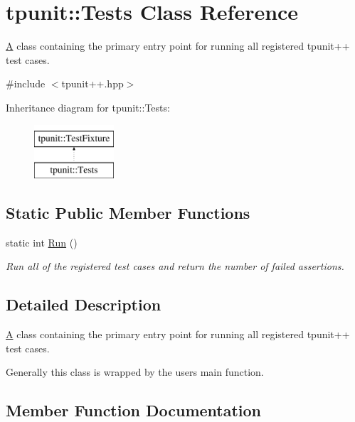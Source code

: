 \hypertarget{classtpunit_1_1Tests}{}\section{tpunit\+::Tests Class Reference}
\label{classtpunit_1_1Tests}


\mbox{\hyperlink{structA}{A}} class containing the primary entry point for running all registered tpunit++ test cases.  




{\ttfamily \#include $<$tpunit++.\+hpp$>$}

Inheritance diagram for tpunit\+::Tests\+:\begin{figure}[H]
\begin{center}
\leavevmode
\includegraphics[height=2.000000cm]{classtpunit_1_1Tests}
\end{center}
\end{figure}
\subsection*{Static Public Member Functions}
\begin{DoxyCompactItemize}
\item 
static int \mbox{\hyperlink{classtpunit_1_1Tests_adbc4f4afa170083f3cf34ea523609fd8}{Run}} ()
\begin{DoxyCompactList}\small\item\em Run all of the registered test cases and return the number of failed assertions. \end{DoxyCompactList}\end{DoxyCompactItemize}


\subsection{Detailed Description}
\mbox{\hyperlink{structA}{A}} class containing the primary entry point for running all registered tpunit++ test cases. 

Generally this class is wrapped by the user\textquotesingle{}s main function. 

\subsection{Member Function Documentation}
\mbox{\label{classtpunit_1_1Tests_adbc4f4afa170083f3cf34ea523609fd8}} 
